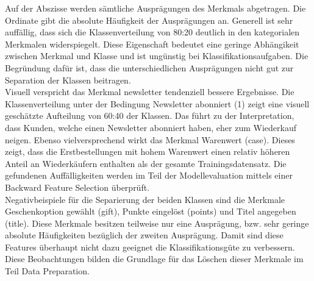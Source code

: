 Auf der Abszisse werden sämtliche Ausprägungen des Merkmals abgetragen. Die Ordinate gibt die absolute Häufigkeit der Ausprägungen an. Generell ist sehr auffällig, dass sich die Klassenverteilung von 80:20 deutlich in den kategorialen Merkmalen widerspiegelt. Diese Eigenschaft bedeutet eine geringe Abhängikeit zwischen Merkmal und Klasse und ist ungünstig bei Klassifikationsaufgaben. Die Begründung dafür ist, dass die unterschiedlichen Ausprägungen nicht gut zur Separation der Klassen beitragen.\\ 

Visuell verspricht das Merkmal newsletter tendenziell bessere Ergebnisse. Die Klassenverteilung unter der Bedingung Newsletter abonniert (1) zeigt eine visuell geschätzte Aufteilung von 60:40 der Klassen. Das führt zu der Interpretation, dass Kunden, welche einen Newsletter abonniert haben, eher zum Wiederkauf neigen. Ebenso vielversprechend wirkt das Merkmal Warenwert (case). Dieses zeigt, dass die Erstbestellungen mit hohem Warenwert einen relativ höheren Anteil an Wiederkäufern enthalten als der gesamte Trainingsdatensatz. Die gefundenen Auffälligkeiten werden im Teil der Modellevaluation mittels einer Backward Feature Selection überprüft.\\
 
Negativbeispiele für die Separierung der beiden Klassen sind die Merkmale Geschenkoption gewählt (gift), Punkte eingelöst (points) und Titel angegeben (title). Diese Merkmale besitzen teilweise nur eine Ausprägung, bzw. sehr geringe absolute Häufigkeiten bezüglich der zweiten Ausprägung. Damit sind diese Features überhaupt nicht dazu geeignet die Klassifikationsgüte zu verbessern. Diese Beobachtungen bilden die Grundlage für das Löschen dieser Merkmale im Teil Data Preparation. 


